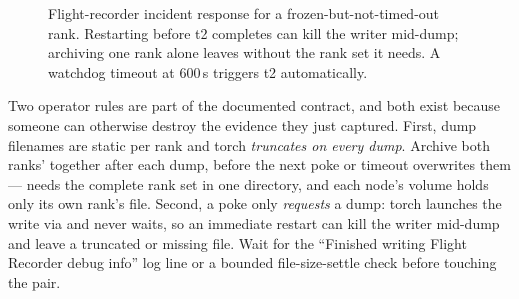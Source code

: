 \begin{figure}[htbp]
\centering
{}
\caption{Flight-recorder incident response for a frozen-but-not-timed-out
rank. Restarting before t2 completes can kill the writer mid-dump;
archiving one rank alone leaves  without the rank set it
needs. A watchdog timeout at 600\,s triggers t2 automatically.}
\label{fig:fabric-fr-timeline}
\end{figure}

Two operator rules are part of the documented contract, and both exist
because someone can otherwise destroy the evidence they just captured.
First, dump filenames are static per rank and torch \emph{truncates on every
dump}. Archive both ranks'  together
after each dump, before the next poke or timeout overwrites them ---
 needs the complete rank set in one directory, and each
node's volume holds only its own rank's file. Second, a poke only
\emph{requests} a dump: torch launches the write via  and
never waits, so an immediate restart can kill the writer mid-dump and leave
a truncated or missing file. Wait for the ``Finished writing Flight
Recorder debug info'' log line or a bounded file-size-settle check before
touching the pair.

